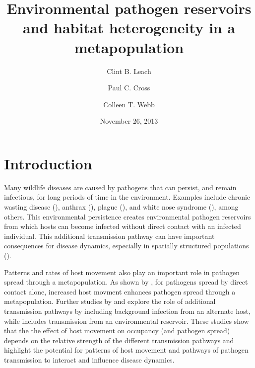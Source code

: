 \documentclass{svjour3}
\begin{document}
\title{Environmental pathogen reservoirs and habitat heterogeneity in a metapopulation}

\author{Clint B. Leach \and Paul C. Cross \and Colleen T. Webb}


\date{November 26, 2013}


\maketitle

\section{Introduction}
\label{intro}

Many wildlife diseases are caused by pathogens that can persist, and remain infectious, for long periods of time in the environment.  Examples include chronic wasting disease (\cite{Miller2006}), anthrax (\cite{Dragon1995}), plague (\cite{Eisen2008}), and white nose syndrome (\cite{Lindner2011}), among others.  This environmental persistence creates environmental pathogen reservoirs from which hosts can become infected without direct contact with an infected individual.  This additional transmission pathway can have important consequences for disease dynamics, especially in spatially structured populations (\cite{Park2012}).

Patterns and rates of host movement also play an important role in pathogen spread through a metapopulation.  As shown by \cite{Hess1996}, for pathogens spread by direct contact alone, increased host movment enhances pathogen spread through a metapopulation.  Further studies by \cite{Gog2002} and \cite{McCallum2002} explore the role of additional transmission pathways by including background infection from an alternate host, while \cite{Park2012} includes transmission from an environmental reservoir.  These studies show that the the effect of host movement on occupancy (and pathogen spread) depends on the relative strength of the different transmission pathways and highlight the potential for patterns of host movement and pathways of pathogen transmission to interact and influence disease dynamics.   
\end{document}
